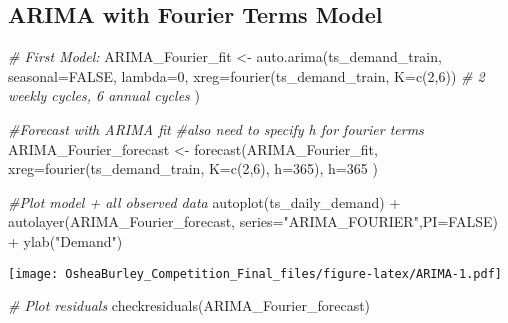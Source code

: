 \documentclass[
]{article}
\newenvironment{Shaded}{\begin{snugshade}}{\end{snugshade}}
\newcommand{\AttributeTok}[1]{\textcolor[rgb]{0.77,0.63,0.00}{#1}}
\newcommand{\CommentTok}[1]{\textcolor[rgb]{0.56,0.35,0.01}{\textit{#1}}}
\newcommand{\ConstantTok}[1]{\textcolor[rgb]{0.00,0.00,0.00}{#1}}
\newcommand{\DecValTok}[1]{\textcolor[rgb]{0.00,0.00,0.81}{#1}}
\newcommand{\FunctionTok}[1]{\textcolor[rgb]{0.00,0.00,0.00}{#1}}
\newcommand{\NormalTok}[1]{#1}
\newcommand{\OtherTok}[1]{\textcolor[rgb]{0.56,0.35,0.01}{#1}}
\newcommand{\SpecialCharTok}[1]{\textcolor[rgb]{0.00,0.00,0.00}{#1}}
\newcommand{\StringTok}[1]{\textcolor[rgb]{0.31,0.60,0.02}{#1}}
\begin{document}
\hypertarget{arima-with-fourier-terms-model}{%
\subsection{ARIMA with Fourier Terms
Model}\label{arima-with-fourier-terms-model}}

\begin{Shaded}
\begin{Highlighting}[]
\CommentTok{\# First Model: }
\NormalTok{ARIMA\_Fourier\_fit }\OtherTok{\textless{}{-}} \FunctionTok{auto.arima}\NormalTok{(ts\_demand\_train, }
                             \AttributeTok{seasonal=}\ConstantTok{FALSE}\NormalTok{, }
                             \AttributeTok{lambda=}\DecValTok{0}\NormalTok{,}
                             \AttributeTok{xreg=}\FunctionTok{fourier}\NormalTok{(ts\_demand\_train, }
                                          \AttributeTok{K=}\FunctionTok{c}\NormalTok{(}\DecValTok{2}\NormalTok{,}\DecValTok{6}\NormalTok{)) }\CommentTok{\# 2 weekly cycles, 6 annual cycles}
\NormalTok{                             )}

\CommentTok{\#Forecast with ARIMA fit}
\CommentTok{\#also need to specify h for fourier terms}
\NormalTok{ARIMA\_Fourier\_forecast }\OtherTok{\textless{}{-}} \FunctionTok{forecast}\NormalTok{(ARIMA\_Fourier\_fit,}
                           \AttributeTok{xreg=}\FunctionTok{fourier}\NormalTok{(ts\_demand\_train,}
                                        \AttributeTok{K=}\FunctionTok{c}\NormalTok{(}\DecValTok{2}\NormalTok{,}\DecValTok{6}\NormalTok{),}
                                        \AttributeTok{h=}\DecValTok{365}\NormalTok{),}
                           \AttributeTok{h=}\DecValTok{365}
\NormalTok{                           ) }

\CommentTok{\#Plot model + all observed data}
\FunctionTok{autoplot}\NormalTok{(ts\_daily\_demand) }\SpecialCharTok{+}
  \FunctionTok{autolayer}\NormalTok{(ARIMA\_Fourier\_forecast, }\AttributeTok{series=}\StringTok{"ARIMA\_FOURIER"}\NormalTok{,}\AttributeTok{PI=}\ConstantTok{FALSE}\NormalTok{) }\SpecialCharTok{+}
  \FunctionTok{ylab}\NormalTok{(}\StringTok{"Demand"}\NormalTok{)}
\end{Highlighting}
\end{Shaded}

\texttt{[image: OsheaBurley\_Competition\_Final\_files/figure-latex/ARIMA-1.pdf]}

\begin{Shaded}
\begin{Highlighting}[]
\CommentTok{\# Plot residuals}
\FunctionTok{checkresiduals}\NormalTok{(ARIMA\_Fourier\_forecast)}
\end{Highlighting}
\end{Shaded}
\end{document}
